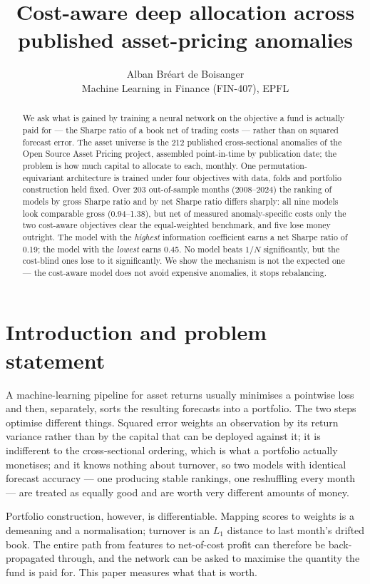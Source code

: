 \documentclass[11pt,a4paper]{article}
\title{\bf Cost-aware deep allocation across published asset-pricing anomalies}
\author{Alban Br\'eart de Boisanger\\[2pt]
\small Machine Learning in Finance (FIN-407), EPFL}
\date{}
\begin{document}
\maketitle

\begin{abstract}
\noindent
We ask what is gained by training a neural network on the objective a fund is
actually paid for --- the Sharpe ratio of a book net of trading costs --- rather
than on squared forecast error. The asset universe is the 212 published
cross-sectional anomalies of the Open Source Asset Pricing project, assembled
point-in-time by publication date; the problem is how much capital to allocate to
each, monthly. One permutation-equivariant architecture is trained under four
objectives with data, folds and portfolio construction held fixed. Over 203
out-of-sample months (2008--2024) the ranking of models by gross Sharpe ratio and
by net Sharpe ratio differs sharply: all nine models look comparable gross
(0.94--1.38), but net of measured anomaly-specific costs only the two cost-aware
objectives clear the equal-weighted benchmark, and five lose money outright. The
model with the \emph{highest} information coefficient earns a net Sharpe ratio of
0.19; the model with the \emph{lowest} earns 0.45. No model beats $1/N$
significantly, but the cost-blind ones lose to it significantly. We show the
mechanism is not the expected one --- the cost-aware model does not avoid
expensive anomalies, it stops rebalancing.
\end{abstract}

\section{Introduction and problem statement}

A machine-learning pipeline for asset returns usually minimises a pointwise loss
and then, separately, sorts the resulting forecasts into a portfolio. The two
steps optimise different things. Squared error weights an observation by its
return variance rather than by the capital that can be deployed against it; it is
indifferent to the cross-sectional ordering, which is what a portfolio actually
monetises; and it knows nothing about turnover, so two models with identical
forecast accuracy --- one producing stable rankings, one reshuffling every month
--- are treated as equally good and are worth very different amounts of money.

Portfolio construction, however, is differentiable. Mapping scores to weights is a
demeaning and a normalisation; turnover is an $L_1$ distance to last month's
drifted book. The entire path from features to net-of-cost profit can therefore be
back-propagated through, and the network can be asked to maximise the quantity the
fund is paid for. This paper measures what that is worth.
\end{document}
